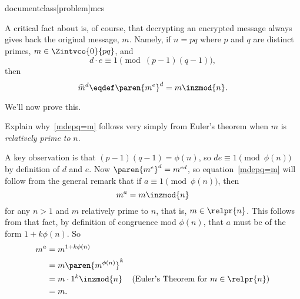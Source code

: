 documentclass[problem]{mcs}

\begin{pcomments}
\end{pcomments}



\begin{problem}
  A critical fact about  is, of course, that decrypting an
  encrypted message always gives back the original message, $m$.
  Namely, if $n=pq$ where $p$ and $q$ are distinct primes, $m \in
  \Zintvco{0}{pq}$, and
    \[
    d\cdot e \equiv 1 \pmod{(p-1)(q-1)},
    \]
    then
    \begin{equation}\label{mdepq=m}
      \widehat{m}^d \eqdef \paren{m^e}^d = m \inzmod{n}.
    \end{equation}

We'll now prove this.

\bparts

\ppart\label{relprime:mdepq-m} Explain why~\eqref{mdepq=m} follows
very simply from Euler's theorem when $m$ is \emph{relatively prime
  to} $n$.

\begin{solution}
A key observation is that $(p-1)(q-1) = \phi(n)$, so $de \equiv 1
\pmod{\phi(n)}$ by definition of $d$ and $e$.  Now $\paren{m^e}^d =
m^{ed}$, so equation~\ref{mdepq=m} will follow from the general remark
that if $a \equiv 1 \pmod{\phi(n)}$, then
\begin{equation}\label{mamzn}
m^a = m \inzmod{n}
\end{equation}
for any $n >1$ and $m$ relatively prime to $n$, that is, $m \in
\relpr{n}$.  This follows from that fact, by definition of congruence
mod $\phi(n)$, that $a$ must be of the form $1+k\phi(n)$.  So
\begin{align*}
m^a
 & = m^{1 + k\phi(n)}\\
 & = m \paren{m^{\phi(n)}}^k\\
 & = m \cdot 1^k \inzmod{n}
        & \text{(Euler's Theorem for $m \in \relpr{n}$)}\\
 & = m.
\end{align*}
\end{solution}


\end{problem}
